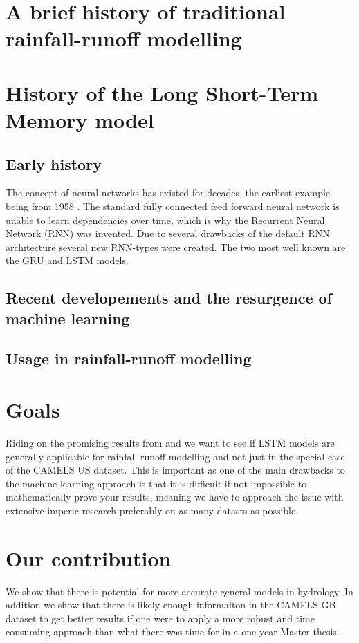 \section{A brief history of traditional rainfall-runoff modelling}

\section{History of the Long Short-Term Memory model}
\subsection{Early history}
The concept of neural networks has existed for decades, the earliest example being 
from 1958 \cite{rosenblatt1958perceptron}. The standard fully connected feed forward 
neural network is unable to learn dependencies over time, which is why the Recurrent 
Neural Network (RNN) was invented. \citationneeded
Due to several drawbacks of the default RNN architecture several new RNN-types 
were created. The two most well known are the GRU and LSTM models. \citationneeded
\subsection{Recent developements and the resurgence of machine learning}
\subsection{Usage in rainfall-runoff modelling}

\section{Goals}
Riding on the promising results from \cite{lstm_second_paper} and \cite{lstm_third_paper}
we want to see if LSTM models are generally applicable for rainfall-runoff modelling 
and not just in the special case of the CAMELS US \cite{CAMELS_US} dataset. This 
is important as one of the main drawbacks to the machine learning approach is that 
it is difficult if not impossible to mathematically prove your results, meaning 
we have to approach the issue with extensive imperic research preferably on as 
many datasts as possible. 
\section{Our contribution}
We show that there is potential for more accurate general models in hydrology. 
In addition we show that there is likely enough informaiton in the CAMELS GB \cite{CAMELS_GB}
dataset to get better results if one were to apply a more robust and time consuming 
approach than what there was time for in a one year Master thesis. 

